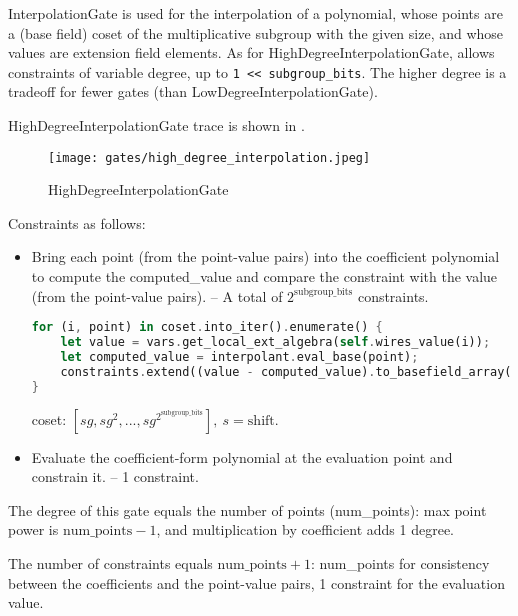 
\hspace*{\fill}

\indent InterpolationGate is used for the interpolation of a polynomial, whose points are a (base field) coset of the multiplicative subgroup 
with the given size, and whose values are extension field elements. As for HighDegreeInterpolationGate,  allows constraints of variable degree, 
up to \verb|1 << subgroup_bits|. The higher degree is a tradeoff for fewer gates (than LowDegreeInterpolationGate).


HighDegreeInterpolationGate trace is shown in .

\begin{figure}[!ht]
    \centering
    \texttt{[image: gates/high\_degree\_interpolation.jpeg]}
    \caption{HighDegreeInterpolationGate}
    \label{fig:high-degree-interpolation}
\end{figure}


Constraints as follows:
\begin{itemize}
    \item Bring each point (from the point-value pairs) into the coefficient polynomial to compute the computed\_value and compare the constraint with the value (from the point-value pairs). -- A total of $2^{\text{subgroup\_bits}}$ constraints.
    \begin{lstlisting}[language=rust]
for (i, point) in coset.into_iter().enumerate() {
    let value = vars.get_local_ext_algebra(self.wires_value(i));
    let computed_value = interpolant.eval_base(point);
    constraints.extend((value - computed_value).to_basefield_array());
}
    \end{lstlisting}
    coset: $[sg, sg^2,...,sg^{2^{\text{subgroup\_bits}}}], \ s=\text{shift}$.
    \item Evaluate the coefficient-form polynomial at the evaluation point and constrain it. -- 1 constraint.
\end{itemize}

The degree of this gate equals the number of points (num\_points): max point power is $\text{num\_points} - 1$, and multiplication by coefficient adds 1 degree.

The number of constraints equals $\text{num\_points} + 1$: num\_points for consistency between the coefficients and the point-value pairs, 1 constraint for the evaluation value. 
